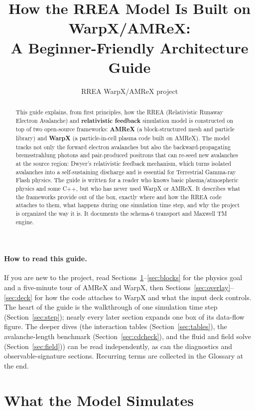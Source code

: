 \documentclass[11pt]{article}
\title{How the RREA Model Is Built on WarpX/AMReX:\\
A Beginner-Friendly Architecture Guide}
\author{RREA WarpX/AMReX project}
\date{}
\begin{document}
\maketitle

\begin{abstract}
This guide explains, from first principles, how the RREA (Relativistic
Runaway Electron Avalanche) and \textbf{relativistic feedback} simulation
model is constructed on top of two open-source frameworks: \textbf{AMReX}
(a block-structured mesh and particle library) and \textbf{WarpX} (a
particle-in-cell plasma code built on AMReX). The model tracks not only the
forward electron avalanches but also the backward-propagating bremsstrahlung
photons and pair-produced positrons that can re-seed new avalanches at the
source region: Dwyer's relativistic feedback mechanism, which turns
isolated avalanches into a self-sustaining discharge and is essential for
Terrestrial Gamma-ray Flash physics. The guide is written for a reader who
knows basic plasma/atmospheric physics and some C++, but who has never used
WarpX or AMReX. It describes what the frameworks provide out of the box,
exactly where and how the RREA code attaches to them, what happens during
one simulation time step, and why the project is organized the way it is.
It documents the schema-6 transport and Maxwell TM engine.
\end{abstract}

\tableofcontents
\newpage

\paragraph*{How to read this guide.} If you are new to the project, read
Sections~\ref{sec:physics}--\ref{sec:blocks} for the physics goal and a
five-minute tour of AMReX and WarpX, then
Sections~\ref{sec:overlay}--\ref{sec:deck} for how the code attaches to WarpX
and what the input deck controls. The heart of the guide is the walkthrough of one
simulation time step (Section~\ref{sec:step}); nearly every later section
expands one box of its data-flow figure. The deeper dives (the
interaction tables (Section~\ref{sec:tables}), the avalanche-length
benchmark (Section~\ref{sec:cdcheck}), and the fluid and field solve
(Section~\ref{sec:field})) can be read independently, as can the
diagnostics and observable-signature sections. Recurring terms are
collected in the Glossary at the end.

\section{What the Model Simulates}\label{sec:physics}
\end{document}

